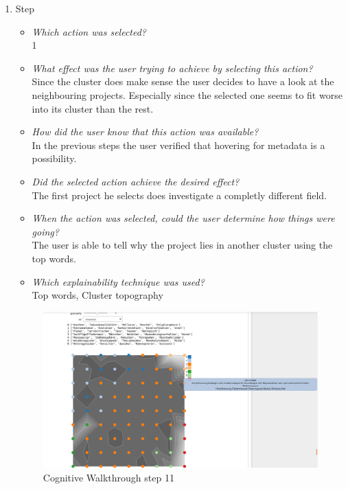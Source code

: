 {\begin{enumerate}
		\item Step
		\begin{itemize}
			\item \textit{Which action was selected?} \\
			1
			\item \textit{What effect was the user trying to achieve by selecting this action?} \\
			Since the cluster does make sense the user decides to have a look at the neighbouring projects. Especially since the selected one seems to fit worse into its cluster than the rest. 
			\item \textit{How did the user know that this action was available?} \\
			In the previous steps the user verified that hovering for metadata is a possibility. 
			\item \textit{Did the selected action achieve the desired effect?} \\
			The first project he selects does investigate a completly different field. 
			\item \textit{When the action was selected, could the user determine how things were going?} \\
			The user is able to tell why the project lies in another cluster using the top words.
			\item \textit{Which explainability technique was used?}\\
			Top words, Cluster topography
		\end{itemize}
		\begin{figure}[H]
			\centering
			\includegraphics[width=400px]{../chapters/validation/pics/9_c}
			\caption{\label{pic:step11} Cognitive Walkthrough step 11}
		\end{figure} \newpage
		

\end{enumerate}}
